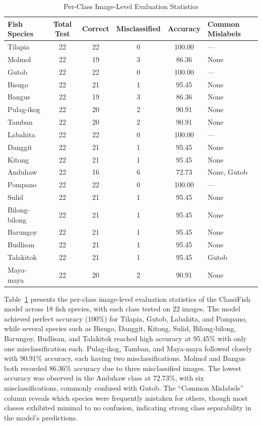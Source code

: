 \begin{table}[H]
\centering
\caption{Per-Class Image-Level Evaluation Statistics}
\begin{tabular}{|l|c|c|c|c|p{4cm}|}
\hline
\textbf{Fish Species} & \textbf{Total Test} & \textbf{Correct} & \textbf{Misclassified} & \textbf{Accuracy} & \textbf{Common Mislabels} \\
\hline
Tilapia        & 22 & 22 & 0 & 100.00 & --- \\
Molmol         & 22 & 19 & 3 & 86.36 & None \\
Gutob          & 22 & 22 & 0 & 100.00 & --- \\
Bisugo         & 22 & 21 & 1 & 95.45 & None \\
Bangus         & 22 & 19 & 3 & 86.36 & None \\
Pulag-ikog     & 22 & 20 & 2 & 90.91 & None \\
Tamban         & 22 & 20 & 2 & 90.91 & None \\
Labahita       & 22 & 22 & 0 & 100.00 & --- \\
Danggit        & 22 & 21 & 1 & 95.45 & None \\
Kitong         & 22 & 21 & 1 & 95.45 & None \\
Anduhaw        & 22 & 16 & 6 & 72.73 & None, Gutob \\
Pompano        & 22 & 22 & 0 & 100.00 & --- \\
Sulid          & 22 & 21 & 1 & 95.45 & None \\
Bilong-bilong  & 22 & 21 & 1 & 95.45 & None \\
Barungoy       & 22 & 21 & 1 & 95.45 & None \\
Budlisan       & 22 & 21 & 1 & 95.45 & None \\
Talakitok      & 22 & 21 & 1 & 95.45 & Gutob \\
Maya-maya      & 22 & 20 & 2 & 90.91 & None \\
\hline
\end{tabular}
\label{tab:per-class-eval}
\end{table}

 Table~\ref{tab:per-class-eval} presents the per-class image-level evaluation statistics of the ClassiFish model across 18 fish species, with each class tested on 22 images. The model achieved perfect accuracy (100\%) for Tilapia, Gutob, Labahita, and Pompano, while several species such as Bisugo, Danggit, Kitong, Sulid, Bilong-bilong, Barungoy, Budlisan, and Talakitok reached high accuracy at 95.45\% with only one misclassification each. Pulag-ikog, Tamban, and Maya-maya followed closely with 90.91\% accuracy, each having two misclassifications. Molmol and Bangus both recorded 86.36\% accuracy due to three misclassified images. The lowest accuracy was observed in the Anduhaw class at 72.73\%, with six misclassifications, commonly confused with Gutob. The “Common Mislabels” column reveals which species were frequently mistaken for others, though most classes exhibited minimal to no confusion, indicating strong class separability in the model’s predictions.

